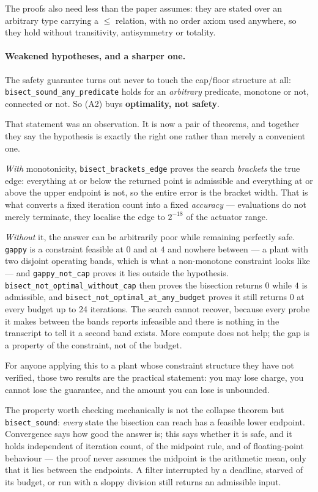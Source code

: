 \documentclass[11pt,letterpaper]{article}
\theoremstyle{definition}
\theoremstyle{remark}
\begin{document}
The proofs also need less than the paper assumes: they are stated over an arbitrary type
carrying a $\le$ relation, with no order axiom used anywhere, so they hold without transitivity,
antisymmetry or totality.

\paragraph{Weakened hypotheses, and a sharper one.} The safety guarantee
turns out never to touch the cap/floor structure at all: \texttt{bisect\_sound\_any\_predicate}
holds for an \emph{arbitrary} predicate, monotone or not, connected or not. So (A2) buys
\textbf{optimality, not safety}.

That statement was an observation. It is now a pair of theorems, and together they say the
hypothesis is exactly the right one rather than merely a convenient one.

\emph{With} monotonicity, \texttt{bisect\_brackets\_edge} proves the search \emph{brackets} the
true edge: everything at or below the returned point is admissible and everything at or above
the upper endpoint is not, so the entire error is the bracket width. That is what converts a
fixed iteration count into a fixed \emph{accuracy} --- \evalCharge{} evaluations do not merely
terminate, they localise the edge to $2^{-18}$ of the actuator range.

\emph{Without} it, the answer can be arbitrarily poor while remaining perfectly safe.
\texttt{gappy} is a constraint feasible at $0$ and at $4$ and nowhere between --- a plant with
two disjoint operating bands, which is what a non-monotone constraint looks like ---
and \texttt{gappy\_not\_cap} proves it lies outside the hypothesis.
\texttt{bisect\_not\_optimal\_without\_cap} then proves the bisection returns $0$ while $4$ is
admissible, and \texttt{bisect\_not\_optimal\_at\_any\_budget} proves it still returns $0$ at
every budget up to 24 iterations. The search cannot recover, because every probe it makes
between the bands reports infeasible and there is nothing in the transcript to tell it a second
band exists. More compute does not help; the gap is a property of the constraint, not of the
budget.

For anyone applying this to a plant whose constraint structure they have not verified, those two
results are the practical statement: you may lose charge, you cannot lose the guarantee, and the
amount you can lose is unbounded.

The property worth checking mechanically is not the collapse theorem but
\texttt{bisect\_sound}: \emph{every} state the bisection can reach has a feasible lower
endpoint. Convergence says how good the answer is; this says whether it is safe, and it holds
independent of iteration count, of the midpoint rule, and of floating-point behaviour --- the
proof never assumes the midpoint is the arithmetic mean, only that it lies between the
endpoints. A filter interrupted by a deadline, starved of its budget, or run with a sloppy
division still returns an admissible input.
\end{document}

